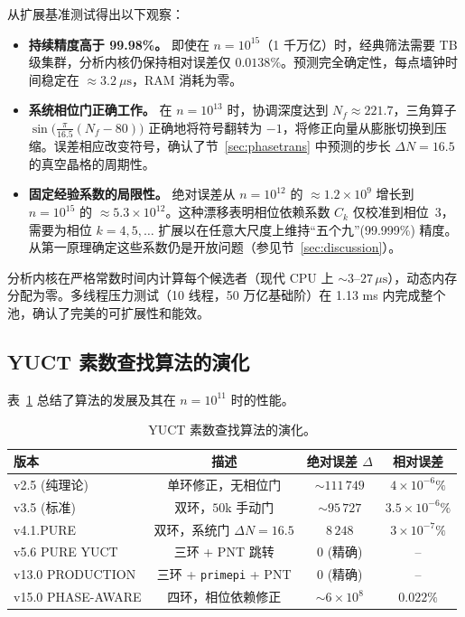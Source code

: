 \documentclass[11pt,a4paper]{article}
\begin{document}
	从扩展基准测试得出以下观察：
	
	\begin{itemize}
		\item \textbf{持续精度高于 99.98\%。}
		即使在 \(n = 10^{15}\)（1 千万亿）时，经典筛法需要 TB 级集群，分析内核仍保持相对误差仅 \(0.0138\%\)。预测完全确定性，每点墙钟时间稳定在 \(\approx 3.2\ \mu\text{s}\)，RAM 消耗为零。
		
		\item \textbf{系统相位门正确工作。}
		在 \(n = 10^{13}\) 时，协调深度达到 \(N_f \approx 221.7\)，三角算子 \(\sin\!\bigl(\frac{\pi}{16.5}(N_f-80)\bigr)\) 正确地将符号翻转为 \(-1\)，将修正向量从膨胀切换到压缩。误差相应改变符号，确认了节~\ref{sec:phasetrans} 中预测的步长 \(\Delta N = 16.5\) 的真空晶格的周期性。
		
		\item \textbf{固定经验系数的局限性。}
		绝对误差从 \(n = 10^{12}\) 的 \(\approx 1.2\times 10^{9}\) 增长到 \(n = 10^{15}\) 的 \(\approx 5.3\times 10^{12}\)。这种漂移表明相位依赖系数 \(C_k\) 仅校准到相位~3，需要为相位 \(k = 4, 5, \dots\) 扩展以在任意大尺度上维持“五个九”(99.999\%) 精度。从第一原理确定这些系数仍是开放问题（参见节~\ref{sec:discussion}）。
	\end{itemize}
	
	分析内核在严格常数时间内计算每个候选者（现代 CPU 上 \(\sim 3\)--\(27\,\mu\text{s}\)），动态内存分配为零。多线程压力测试（10 线程，50 万亿基础阶）在 1.13 ms 内完成整个池，确认了完美的可扩展性和能效。
	
	\subsection{YUCT 素数查找算法的演化}
	表~\ref{tab:all-versions} 总结了算法的发展及其在 \(n=10^{11}\) 时的性能。
	
	\begin{table}[htbp]
		\centering
		\caption{YUCT 素数查找算法的演化。}
		\label{tab:all-versions}
		\begin{tabular}{l c c c}
			\toprule
			版本 & 描述 & 绝对误差 \(\Delta\) & 相对误差 \\
			\midrule
			v2.5 (纯理论)  & 单环修正，无相位门 & \(\sim 111\,749\) & \(4\times10^{-6}\%\) \\
			v3.5 (标准)    & 双环，\(50\)k 手动门 & \(\sim 95\,727\) & \(3.5\times10^{-6}\%\) \\
			v4.1.PURE       & 双环，系统门 \(\Delta N=16.5\) & \(8\,248\) & \(3\times10^{-7}\%\) \\
			v5.6 PURE YUCT  & 三环 + PNT 跳转 & 0 (精确) & -- \\
			v13.0 PRODUCTION & 三环 + \texttt{primepi} + PNT & 0 (精确) & -- \\
			v15.0 PHASE-AWARE & 四环，相位依赖修正 & \(\sim 6\times10^{8}\) & \(0.022\%\) \\
			\bottomrule
		\end{tabular}
	\end{table}
	
\end{document}
